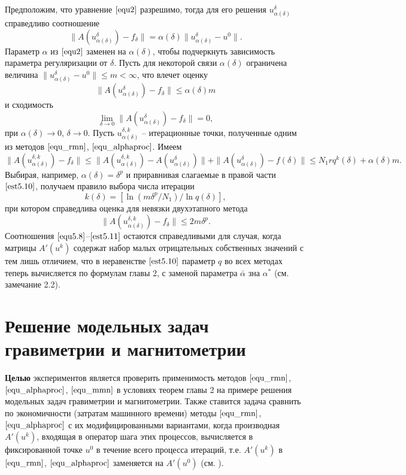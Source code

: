 Предположим, что уравнение $\eqref{equ2}$ разрешимо, тогда для его решения $u_{\alpha(\delta)}^{\delta}$ справедливо соотношение
\begin{equation}\label{equ5.8}
\|A(u_{\alpha(\delta)}^{\delta})-f_\delta\|=\alpha(\delta)\|u_{\alpha(\delta)}^{\delta}-u^0\|.
\end{equation}
Параметр $\alpha$ из $\eqref{equ2}$ заменен на $\alpha(\delta)$, чтобы подчеркнуть зависимость параметра регуляризации от $\delta$.
Пусть для некоторой связи $\alpha(\delta)$ ограничена величина $\|u_{\alpha(\delta)}^{\delta}-u^0\|\le m <\infty$, что влечет оценку
\begin{equation}\label{est5.9}
\|A(u_{\alpha(\delta)}^{\delta})-f_\delta\|\le\alpha(\delta)m
\end{equation}
и сходимость $$\lim_{\delta\to 0}\|A(u_{\alpha(\delta)}^{\delta})-f_\delta\|=0,$$ при $\alpha(\delta)\to 0$, $\delta\to 0$. Пусть ${u_{\alpha(\delta)}^{\delta, k}}$ -- итерационные точки, полученные одним из методов $\eqref{equ_rmn}$, $\eqref{equ_alphaproc}$. Имеем
\begin{equation}\label{est5.10}
\|A(u_{\alpha(\delta)}^{\delta, k})-f_\delta\|\le\|A(u_{\alpha(\delta)}^{\delta, k})-A(u_{\alpha(\delta)}^{\delta})\|+\|A(u_{\alpha(\delta)}^{\delta})-f(\delta)\|\le N_1 r q^k(\delta)+\alpha(\delta)m.
\end{equation}
Выбирая, например, $\alpha(\delta)=\delta^p$ и приравнивая слагаемые в правой части $\eqref{est5.10}$, получаем правило выбора числа итерации
$$k(\delta)=\left [\ln(m\delta^p/N_1)/\ln q(\delta)\right ],$$
при котором справедлива оценка для невязки двухэтапного метода
\begin{equation}\label{est5.11}
\|A(u_{\alpha(\delta)}^{\delta,k})-f_\delta\|\le 2m\delta^p.
\end{equation}
{\remark Соотношения $\eqref{equ5.8}$--$\eqref{est5.11}$ остаются справедливыми для случая, когда матрицы $A'(u^k)$ содержат набор малых отрицательных собственных значений с тем лишь отличием, что в неравенстве $\eqref{est5.10}$ параметр $q$ во всех методах теперь вычисляется по формулам главы 2, с заменой параметра $\bar\alpha$ зна $\alpha^*$ (см. замечание 2.2).}

\newpage
\section{Решение модельных задач гравиметрии и магнитометрии}

{\bfseries Целью} экспериментов является проверить применимость методов $\eqref{equ_rmn}$, $\eqref{equ_alphaproc}$, $\eqref{equ_mmn}$ в условиях теорем главы 2 на примере решения модельных задач гравиметрии и магнитометрии. Также ставится задача сравнить по экономичности (затратам машинного времени) методы $\eqref{equ_rmn}$, $\eqref{equ_alphaproc}$ с их модифицированными вариантами, когда производная $A'(u^k)$, входящая в оператор шага этих процессов, вычисляется в фиксированной точке $u^0$ в течение всего процесса итераций, т.е. $A'(u^k)$ в $\eqref{equ_rmn}$, $\eqref{equ_alphaproc}$ заменяется на $A'(u^0)$ (см. \cite{Vasin2014, Vasin2016}). 


